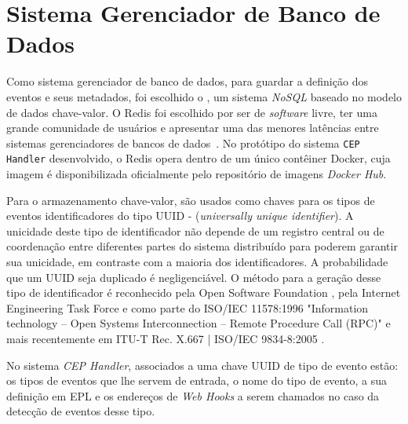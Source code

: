 \section{Sistema Gerenciador de Banco de Dados}
\label{sec:redis}

Como sistema gerenciador de banco de dados, para guardar a definição dos eventos e seus metadados, foi escolhido o \cite{Redis}, um sistema \textit{NoSQL} baseado no modelo de dados chave-valor.
O Redis foi escolhido por ser de \textit{software} livre, ter uma grande comunidade de usuários e apresentar uma das menores latências entre sistemas gerenciadores de bancos de dados~\citep{10.14778/2367502.2367512}.
No protótipo do sistema \texttt{CEP Handler} desenvolvido, o Redis opera dentro de um único contêiner Docker, cuja imagem é disponibilizada oficialmente pelo repositório de imagens \textit{Docker Hub}.
 

Para o armazenamento chave-valor, são usados como chaves para os tipos de eventos identificadores do tipo UUID - (\textit{universally unique identifier}). A unicidade deste tipo de identificador não depende de um registro central ou de coordenação entre diferentes partes do sistema distribuído para poderem garantir sua unicidade, em contraste com a maioria dos identificadores. A probabilidade que um UUID seja duplicado é negligenciável. O método para a geração desse tipo de identificador é reconhecido pela Open Software Foundation
\citep{osf}, 
pela  Internet Engineering Task Force %
\citep{ietf}
e como parte do  ISO/IEC 11578:1996 "Information technology – Open Systems Interconnection – Remote Procedure Call (RPC)" e mais recentemente em  ITU-T Rec. X.667 | ISO/IEC 9834-8:2005
\citep{ISOUUID}.%

No sistema \textit{CEP Handler}, associados a  uma chave UUID de tipo de evento estão: os tipos de eventos que lhe servem de entrada, o nome do tipo de evento, a sua definição em EPL e os endereços de \textit{Web Hooks} a serem chamados no caso da detecção de eventos desse tipo.



